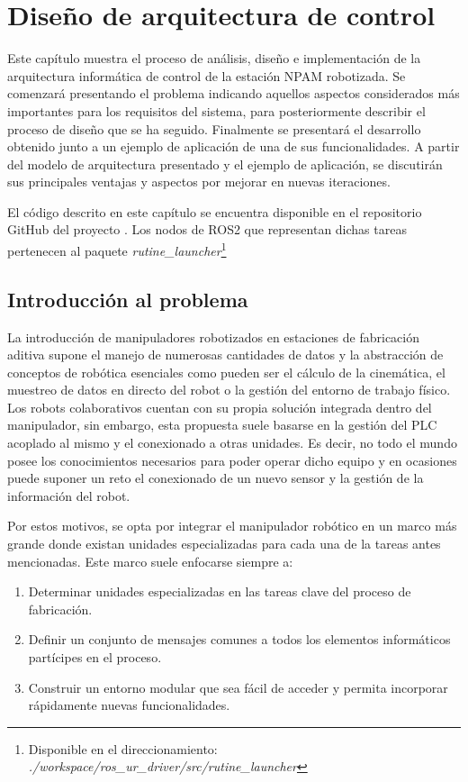 \chapter{Diseño de arquitectura de control}
\label{cap: diseno_arquitectura}

Este capítulo muestra el proceso de análisis, diseño e implementación de la arquitectura informática de control de la estación \acrshort{NPAM} robotizada. Se comenzará presentando el problema indicando aquellos aspectos considerados más importantes para los requisitos del sistema, para posteriormente describir el proceso de diseño que se ha seguido. Finalmente se presentará el desarrollo obtenido junto a un ejemplo de aplicación de una de sus funcionalidades. A partir del modelo de arquitectura presentado y el ejemplo de aplicación, se discutirán sus principales ventajas y aspectos por mejorar en nuevas iteraciones.

El código descrito en este capítulo se encuentra disponible en el repositorio GitHub del proyecto \cite{repo_github_TFM_MiguelLerinAlonso}. Los nodos de ROS2 que representan dichas tareas pertenecen al paquete \textit{rutine\_launcher}\footnote{Disponible en el direccionamiento: \textit{./workspace/ros\_ur\_driver/src/rutine\_launcher}}


\section{Introducción al problema}
La introducción de manipuladores robotizados en estaciones de fabricación aditiva supone el manejo de numerosas cantidades de datos y la abstracción de conceptos de robótica esenciales como pueden ser el cálculo de la cinemática, el muestreo de datos en directo del robot o la gestión del entorno de trabajo físico. Los robots colaborativos cuentan con su propia solución integrada dentro del manipulador, sin embargo, esta propuesta suele basarse en la gestión del \acrshort{PLC} acoplado al mismo y el conexionado a otras unidades. Es decir, no todo el mundo posee los conocimientos necesarios para poder operar dicho equipo y en ocasiones puede suponer un reto el conexionado de un nuevo sensor y la gestión de la información del robot.

Por estos motivos, se opta por integrar el manipulador robótico en un marco más grande donde existan unidades especializadas para cada una de la tareas antes mencionadas. Este marco suele enfocarse siempre a:

\begin{enumerate}
    \item Determinar unidades especializadas en las tareas clave del proceso de fabricación.
    \item Definir un conjunto de mensajes comunes a todos los elementos informáticos partícipes en el proceso.
    \item Construir un entorno modular que sea fácil de acceder y permita incorporar rápidamente nuevas funcionalidades.
\end{enumerate}

